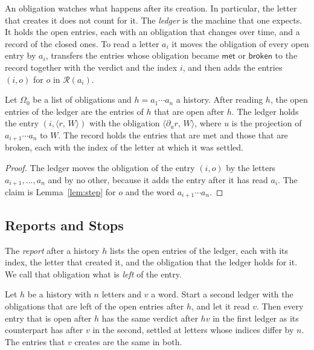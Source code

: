 \documentclass[acmsmall,nonacm,screen]{acmart}
\newcommand{\kw}[1]{\mathsf{#1}}
\newcommand{\ob}[2]{\langle #1,\, #2 \rangle}
\newcommand{\rules}{\mathcal{R}}
\newcommand{\met}{\kw{met}}
\newcommand{\brk}{\kw{broken}}
\newcommand{\dv}[2]{\partial_{#1}#2}
\begin{document}
An obligation watches what happens after its creation. In particular, the letter that
creates it does not count for it. The \emph{ledger} is the machine that one expects. It
holds the open entries, each with an obligation that changes over time, and a record of the
closed ones. To read a letter $a_i$ it moves the obligation of every open entry by $a_i$,
transfers the entries whose obligation became $\met$ or $\brk$ to the record together with
the verdict and the index $i$, and then adds the entries $(i, o)$ for $o$ in $\rules(a_i)$.

\begin{theorem}
\label{thm:ledger}
Let $\Omega_0$ be a list of obligations and $h = a_1 \cdots a_n$ a history. After reading
$h$, the open entries of the ledger are the entries of $h$ that are open after $h$. The
ledger holds the entry $(i, \ob{r}{W})$ with the obligation $\ob{\dv{u}{r}}{W}$, where $u$
is the projection of $a_{i+1} \cdots a_n$ to $W$. The record holds the entries that are met
and those that are broken, each with the index of the letter at which it was settled.
\end{theorem}

\begin{proof}
The ledger moves the obligation of the entry $(i, o)$ by the letters $a_{i+1}, \ldots, a_n$
and by no other, because it adds the entry after it has read $a_i$. The claim is
Lemma~\ref{lem:step} for $o$ and the word $a_{i+1} \cdots a_n$.
\end{proof}

\subsection{Reports and Stops}

\begin{definition}[Report]
The \emph{report} after a history $h$ lists the open entries of the ledger, each with its
index, the letter that created it, and the obligation that the ledger holds for it. We call
that obligation what is \emph{left} of the entry.
\end{definition}

\begin{proposition}
\label{prop:enough}
Let $h$ be a history with $n$ letters and $v$ a word. Start a second ledger with the
obligations that are left of the open entries after $h$, and let it read $v$. Then every
entry that is open after $h$ has the same verdict after $hv$ in the first ledger as its
counterpart has after $v$ in the second, settled at letters whose indices differ by $n$. The
entries that $v$ creates are the same in both.
\end{proposition}
\end{document}
